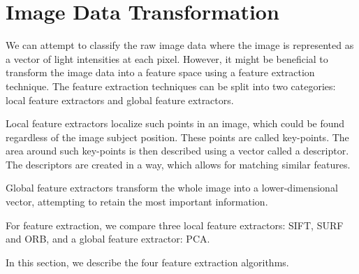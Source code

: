 \chapter{Image Data Transformation}

We can attempt to classify the raw image data where the image is represented as a vector of light intensities at each pixel. However, it might be beneficial to transform the image data into a feature space using a feature extraction technique. The feature extraction techniques can be split into two categories: local feature extractors and global feature extractors\cite{lee2005}.

Local feature extractors localize such points in an image, which could be found regardless of the image subject position. These points are called key-points. The area around such key-points is then described using a vector called a descriptor. The descriptors are created in a way, which allows for matching similar features.

Global feature extractors transform the whole image into a lower-dimensional vector, attempting to retain the most important information.

For feature extraction, we compare three local feature extractors: SIFT, SURF and ORB, and a global feature extractor: PCA.

In this section, we describe the four feature extraction algorithms.











